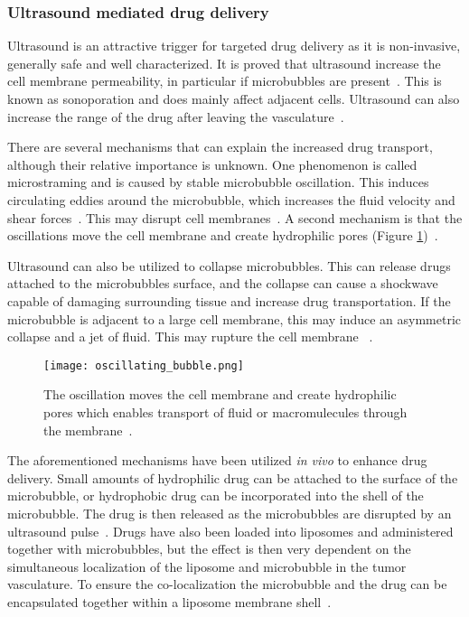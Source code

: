 \subsubsection{Ultrasound mediated drug delivery}
\label{sec:umdd}
Ultrasound is an attractive trigger for targeted drug delivery as it is non-invasive, generally safe and well characterized. It is proved that ultrasound increase the cell membrane permeability, in particular if microbubbles are present~\cite{VanWamel2006a}. This is known as sonoporation and does mainly affect adjacent cells. Ultrasound can also increase the range of the drug after leaving the vasculature~\cite{Eggen2013}.

There are several mechanisms that can explain the increased drug transport, although their relative importance is unknown. One phenomenon is called microstraming and is caused by stable microbubble oscillation. This induces circulating eddies around the microbubble, which increases the fluid velocity and shear forces~\cite{Nyborg1982}. This may disrupt cell membranes~\cite{Marmottant2003}. A second mechanism is that the oscillations move the cell membrane and create hydrophilic pores (Figure \ref{Fig:oscillating_bubble})~\cite{VanWamel2006a}.

Ultrasound can also be utilized to collapse microbubbles. This can release drugs attached to the microbubbles surface, and the collapse can cause a shockwave capable of damaging surrounding tissue and increase drug transportation. If the microbubble is adjacent to a large cell membrane, this may induce an asymmetric collapse and a jet of fluid. This may rupture the cell membrane ~\cite{Pitt2004}.  

\begin{figure}[h]
  \centering
  \texttt{[image: oscillating\_bubble.png]}
  \caption{The oscillation moves the cell membrane and create hydrophilic pores which enables transport of fluid or macromulecules through the membrane~\cite{VanWamel2006a}.}
  \label{Fig:oscillating_bubble}
\end{figure}


The aforementioned mechanisms have been utilized \textit{in vivo} to enhance drug delivery. Small amounts of hydrophilic drug can be attached to the surface of the microbubble, or hydrophobic drug can be incorporated into the shell of the microbubble. The drug is then released as the microbubbles are disrupted by an ultrasound pulse~\cite{Liu2006}. Drugs have also been loaded into liposomes and administered together with microbubbles, but the effect is then very dependent on the simultaneous localization of the liposome and microbubble in the tumor vasculature. To ensure the co-localization the microbubble and the drug can be encapsulated together within a liposome membrane shell~\cite{Ibsen2011}.


